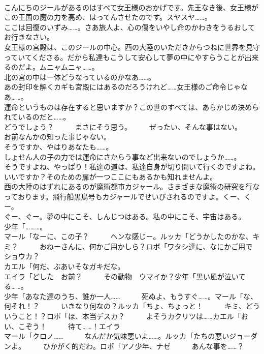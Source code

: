 \documentclass[8pt]{extreport}
\begin{document}
\begin{CJK}{UTF8}{min}
\\	こんにちのジールがあるのはすべて女王様のおかげです。先王なき後、女王様がこの王国の魔の力を高め、はってんさせたのです。スヤスヤ……。	
\\	ここは回復のいずみ……。さあ旅人よ、心の傷をいやし命のかわきをうるおしてお行きなさい。	
\\	女王様の宮殿は、このジールの中心。西の大陸のいただきからつねに世界を見守っていてくださる。だから私達もこうして安心して夢の中にやすらうことが出来るのだよ。ムニャムニャ……。	
\\	北の宮の中は一体どうなっているのかなあ……。	
\\	あの封印を解くカギも宮殿にはあるのだろうけれど……女王様のご命令じゃなあ……。	
\\	運命というものは存在すると思いますか？この世のすべては、あらかじめ決められているのだと……。	
\\	どうでしょう？　　　まさにそう思う。　　　ぜったい、そんな事はない。　　　お前なんかの知った事じゃない。	
\\	そうですか、やはりあなたも……。	
\\	しょせん人の子の力では運命にさからう事など出来ないのでしょうか……。	
\\	そうですよね、やっぱり！私達の道は、私達自身が切り開いて行くのですよね。	
\\	いいですか？そのための扉が一つここにもあるかも知れませんよ。	
\\	西の大陸のはずれにあるのが魔術都市カジャール。さまざまな魔術の研究を行なっております。飛行船黒鳥号もカジャールでせいびされるのですよ。くー、くー。	
\\	ぐー、ぐー。夢の中にこそ、しんじつはある。私の中にこそ、宇宙はある。	
\\	少年「………。	
\\	マール「なーに、この子？　　　ヘンな感じー。ルッカ「どうかしたのかな、キミ？　　　おねーさんに、何かご用かしら？ロボ「ワタシ達に、なにかご用で　　　ショウカ？	
\\	カエル「何だ、ぶあいそなガキだな。	
\\	エイラ「どした　お前？　　　その動物　ウマイか？少年「黒い風が泣いてる……。	
\\	少年「あなた達のうち、誰か一人……　　　死ぬよ、もうすぐ……。マール「な、何それ！？　　　いきなり何なの？ルッカ「ちょ、ちょっと！　　　キミ、どういうこと！？ロボ「ほ、本当デスカ？　　　よそうカクリツは……カエル「おい、こぞう！　　　待て……！エイラ
\\	マール「クロノ……　　　なんだか気味悪いよ……。ルッカ「たちの悪いジョーダンよ。　　　ひかがく的だわ。ロボ「アノ少年、ナゼ　　　あんな事を……？	

\end{CJK}
\end{document}
